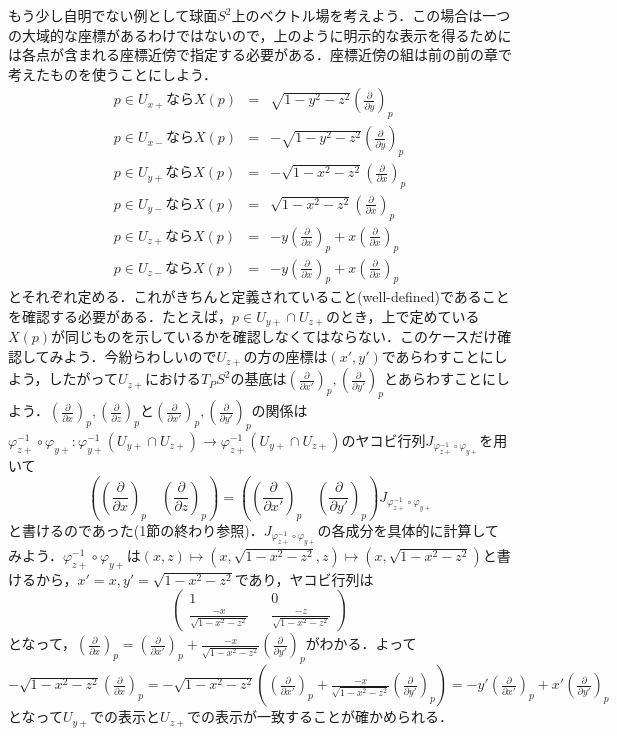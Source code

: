 \documentclass{jsarticle}
\def\vecb{\begin{pmatrix}}
\def\vece{\end{pmatrix}}
\def\dfrac{\displaystyle\frac}
\def\delxp{\left(\dfrac{\partial}{\partial x}\right)_p}
\def\delyp{\left(\dfrac{\partial}{\partial y}\right)_p}
\def\delzp{\left(\dfrac{\partial}{\partial z}\right)_p}
\def\delxdp{\left(\dfrac{\partial}{\partial x'}\right)_p}
\def\delydp{\left(\dfrac{\partial}{\partial y'}\right)_p}
\begin{document}
もう少し自明でない例として球面$S^2$上のベクトル場を考えよう．この場合は一つの大域的な座標があるわけではないので，上のように明示的な表示を得るためには各点が含まれる座標近傍で指定する必要がある．座標近傍の組は前の前の章で考えたものを使うことにしよう．
\begin{eqnarray*}
p\in U_{x+}ならX(p) & = &\sqrt{1-y^2-z^2}\delyp \\
p\in U_{x-}ならX(p) & = &-\sqrt{1-y^2-z^2}\delyp  \\
p\in U_{y+}ならX(p) & = &-\sqrt{1-x^2-z^2}\delxp \\
p\in U_{y-}ならX(p) & = &\sqrt{1-x^2-z^2}\delxp \\
p\in U_{z+}ならX(p) & =  &-y\delxp+x\delxp \\
p\in U_{z-}ならX(p) & = &-y\delxp+x\delxp 
\end{eqnarray*}
とそれぞれ定める．これがきちんと定義されていること(well-defined)であることを確認する必要がある．たとえば，$p\in U_{y+}\cap U_{z+}$のとき，上で定めている$X(p)$が同じものを示しているかを確認しなくてはならない．このケースだけ確認してみよう．今紛らわしいので$U_{z+}$の方の座標は$(x',y')$であらわすことにしよう，したがって$U_{z+}$における$T_PS^2$の基底は$\delxdp,\delydp$とあらわすことにしよう．$\delxp,\delzp$と$\delxdp,\delydp$の関係は$\varphi_{z+}^{-1}\circ\varphi_{y+}:\varphi_{y+}^{-1}(U_{y+}\cap U_{z+})\rightarrow\varphi_{z+}^{-1}(U_{y+}\cap U_{z+})$のヤコビ行列$J_{\varphi_{z+}^{-1}\circ\varphi_{y+}}$を用いて
$$
\left(\delxp\quad\delzp\right)=\left(\delxdp\quad\delydp\right)J_{\varphi_{z+}^{-1}\circ\varphi_{y+}}
$$
と書けるのであった(1節の終わり参照)．$J_{\varphi_{z+}^{-1}\circ\varphi_{y+}}$の各成分を具体的に計算してみよう．$\varphi_{z+}^{-1}\circ\varphi_{y+}$は$(x,z)\mapsto(x,\sqrt{1-x^2-z^2},z)\mapsto(x,\sqrt{1-x^2-z^2})$と書けるから，$x'=x,y'=\sqrt{1-x^2-z^2}$であり，ヤコビ行列は
$$
\vecb
1 && 0 \\
\frac{-x}{\sqrt{1-x^2-z^2}} && \frac{-z}{\sqrt{1-x^2-z^2}}
\vece
$$
となって，$\delxp=\delxdp+\dfrac{-x}{\sqrt{1-x^2-z^2}}\delydp$がわかる．よって$-\sqrt{1-x^2-z^2}\delxp =-\sqrt{1-x^2-z^2}\left(\delxdp+\dfrac{-x}{\sqrt{1-x^2-z^2}}\delydp\right) =-y'\delxdp+x'\delydp$となって$U_{y+}$での表示と$U_{z+}$での表示が一致することが確かめられる．
\end{document}
